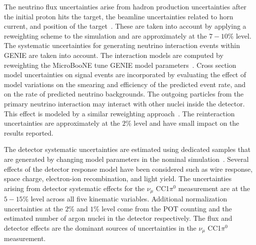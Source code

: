 \documentclass[%
 reprint,
 amsmath,amssymb, longbibliography,
 aps, 
 prd,
 twocolumn,
 showpacs,
 superscriptaddress
]{revtex4-2}
\begin{document}
The neutrino flux uncertainties arise from hadron production uncertainties after the initial proton hits the target, the beamline uncertainties related to horn current, and position of the target~\cite{PhysRevD.79.072002}. These are taken into account by applying a reweighting scheme to the simulation and are approximately at the $7-10$\% level. 
The systematic uncertainties for generating neutrino interaction events within GENIE are taken into account. The interaction models are computed by reweighting the MicroBooNE tune GENIE model parameters~\cite{PhysRevD.105.072001}. Cross section model uncertainties on signal events are incorporated by evaluating the effect of model variations on the smearing and efficiency of the predicted event rate, and on the rate of predicted neutrino backgrounds. The outgoing particles from the primary neutrino interaction may interact with other nuclei inside the detector. This effect is modeled by a similar reweighting approach~\cite{Calcutt_2021}. The reinteraction uncertainties are approximately at the $2$\% level and have small impact on the results reported. 

The detector systematic uncertainties are estimated using dedicated samples that are generated by changing model parameters in the nominal simulation~\cite{det_unc}. Several effects of the detector response model have been considered such as wire response, space charge, electron-ion recombination, and light yield. The uncertainties arising from detector systematic effects for the $\nu_{\mu}$ CC1$\pi^0$ measurement are at the $5-15$\% level across all five kinematic variables. Additional normalization uncertainties at the $2$\% and $1$\% level come from the POT counting and the estimated number of argon nuclei in the detector respectively. The flux and detector effects are the dominant sources of uncertainties in the $\nu_{\mu}$ CC1$\pi^0$ measurement.  
\end{document}
